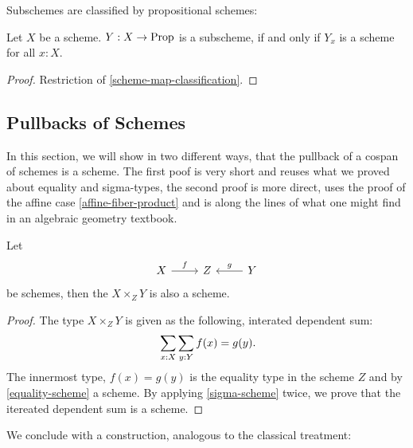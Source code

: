 Subschemes are classified by propositional schemes:

\begin{corollary}
  Let $X$ be a scheme.
  $Y:X\to\mathrm{Prop}$ is a subscheme,
  if and only if $Y_x$ is a scheme for all $x:X$.
\end{corollary}

\begin{proof}
  Restriction of \cref{scheme-map-classification}.
\end{proof}

\subsection{Pullbacks of Schemes}

In this section, we will show in two different ways,
that the pullback of a cospan of schemes is a scheme.
The first poof is very short and reuses what we proved about equality and sigma-types,
the second proof is more direct, uses the proof of the affine case \cref{affine-fiber-product}
and is along the lines of what one might find in an algebraic geometry textbook.

\begin{theorem}%
  \label{fiber-product-scheme}
  Let
  \[
    \begin{tikzcd}
      X\ar[r,"f"] & Z & Y\ar[l,swap,"g"]
    \end{tikzcd}
  \]
  be schemes, then the  $X\times_Z Y$ is also a scheme.
\end{theorem}

\begin{proof}
  The type $X\times_Z Y$ is given as the following, interated dependent sum:
  \[ \sum_{x:X}\sum_{y:Y}f(x)=g(y)\rlap{.}\]
  The innermost type, $f(x)=g(y)$
  is the equality type in the scheme $Z$ and by \cref{equality-scheme} a scheme.
  By applying \cref{sigma-scheme} twice, we prove that the itereated dependent sum is a scheme.
\end{proof}

We conclude with a construction, analogous to the classical treatment:

